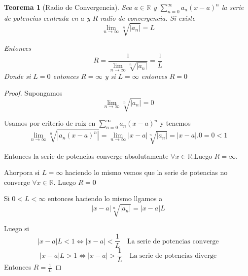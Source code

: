 \documentclass{article}
\theoremstyle{break}
\newtheorem{theorem}{Teorema}[section]
\begin{document}
\begin{theorem}[Radio de Convergencia]
	Sea $a\in \mathbb{R}$ y $\sum_{n=0}^{\infty} a_n(x-a)^n$ la serie de potencias 
	centrada en $a$ y $R$ radio de convergencia. Si existe \[  \lim_{n \rightarrow \infty} \sqrt[n]{|a_n|} = L\]

	Entonces \[ R = \frac{1}{\lim_{n \rightarrow \infty} \sqrt[n]{|a_n|}} = \frac{1}{L} \]
	Donde si $L=0$ entonces $R=\infty$ y si $L=\infty$ entonces $R=0$

\end{theorem}
\begin{proof}

	Supongamos \[  \lim_{n \rightarrow \infty} \sqrt[n]{|a_n|} = 0\] 
	
	Usamos por criterio de raiz en $\sum_{n=0}^{\infty} a_n(x-a)^n$ y tenemos 
	\[ \lim_{n \rightarrow \infty}	\sqrt[n]{|a_n(x-a)^n|} = \lim_{n \rightarrow \infty} |x-a| \sqrt[n]{|a_n|} 
	= |x-a|.0 = 0 < 1\]

	Entonces la serie de potencias converge absolutamente $\forall x \in \mathbb{R}$.Luego $R=\infty$.

	Ahorpora si $L=\infty$ haciendo lo mismo vemos que la serie de potencias no converge $\forall x \in \mathbb{R}$.
	Luego $R=0$

	Si $0<L<\infty$ entonces haciendo lo mismo llgamos a \[ |x-a|\sqrt[n]{|a_n|} = |x-a|L\]

	Luego si \[ |x-a|L < 1 \iff |x-a| < \frac{1}{L} \quad \text{La serie de potencias converge}\] 
	\[ |x-a|L > 1 \iff |x-a| > \frac{1}{L} \quad \text{La serie de potencias diverge}\] 
	Entonces $R=\frac{1}{L}$

\end{proof}
\end{document}
